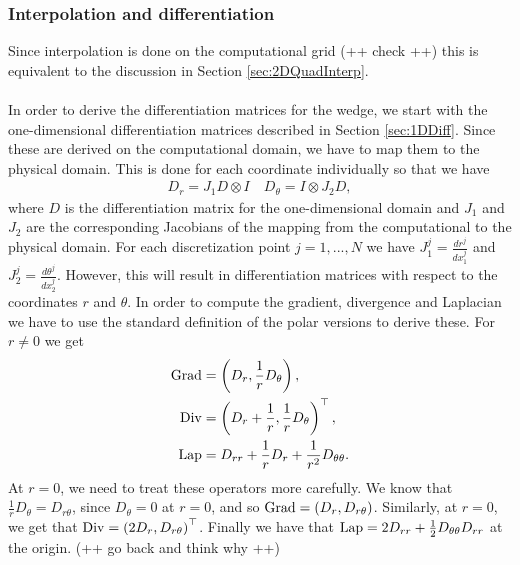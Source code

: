 \subsubsection{Interpolation and differentiation}
Since interpolation is done on the computational grid (++ check ++) this is equivalent to the discussion in Section \ref{sec:2DQuadInterp}.
\\
\\
In order to derive the differentiation matrices for the wedge, we start with the one-dimensional differentiation matrices described in Section \ref{sec:1DDiff}. Since these are derived on the computational domain, we have to map them to the physical domain. This is done for each coordinate individually so that we have
\begin{align*}
	D_r = J_1D \otimes I \quad 	D_\theta =I \otimes J_2D,
\end{align*} 
where $D$ is the differentiation matrix for the one-dimensional domain and $J_1$ and $J_2$  are the corresponding Jacobians of the mapping from the computational to the physical domain. For each discretization point $j = 1,...,N$ we have $ J_1^j= \frac{dr^j}{dx_1^j}$ and $J_2^j = \frac{d\theta^j}{dx_2^j}$.
However, this will result in differentiation matrices with respect to the coordinates $r$ and $\theta$. In order to compute the gradient, divergence and Laplacian we have to use the standard definition of the polar versions to derive these. For $ r \neq 0$ we get
\begin{align*}
	\operatorname{Grad}  &= \left(D_r, \frac{1}{r} D_\theta\right) ,\\
	\operatorname{Div} &= \left(D_r + \frac{1}{r}, \frac{1}{r} D_\theta\right)^\top ,\\
	\operatorname{Lap}  &= D_{rr} +\frac{1}{r}D_r +  \frac{1}{r^2} D_{\theta \theta}.
\end{align*}
At $ r = 0$, we need to treat these operators more carefully. We know that $\frac{1}{r} D_\theta = D_{r\theta}$, since $D_\theta =0$ at $r = 0$, and so $ \operatorname{Grad} = \left(D_r, D_{r\theta}\right)$. Similarly, at $r = 0$, we get that $\operatorname{Div} = \left(2D_r, D_{r\theta}\right)^\top$. Finally we have that $\operatorname{Lap} = 2 D_{rr} + \frac{1}{2} D_{\theta\theta}D_{rr}$ at the origin. (++ go back and think why ++)



